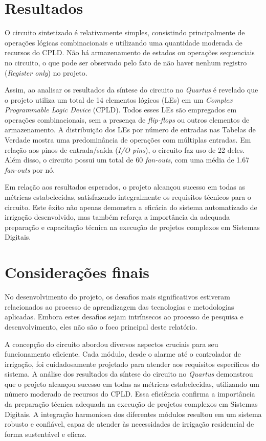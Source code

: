 \documentclass[
	article,			%
	11pt,				%
	oneside,			%
	a4paper,			%
	english,			%
	brazil,				%
	sumario=tradicional
	]{abntex2}
\begin{document}
\section{Resultados}

O circuito sintetizado é relativamente simples, consistindo principalmente de operações lógicas combinacionais e utilizando uma quantidade moderada de recursos do CPLD. Não há armazenamento de estados ou operações sequenciais no circuito, o que pode ser observado pelo fato de não haver nenhum registro (\textit{Register only}) no projeto. 


Assim, ao analisar os resultados da síntese do circuito no \textit{Quartus} é revelado que o projeto utiliza um total de 14 elementos lógicos (LEs) em um \textit{Complex Programmable Logic Device} (CPLD). Todos esses LEs são empregados em operações combinacionais, sem a presença de \textit{flip-flops} ou outros elementos de armazenamento. A distribuição dos LEs por número de entradas nas Tabelas de Verdade mostra uma predominância de operações com múltiplas entradas. Em relação aos pinos de entrada/saída (\textit{I/O pins}), o circuito faz uso de 22 deles. Além disso, o circuito possui um total de 60 \textit{fan-outs}, com uma média de 1.67 \textit{fan-outs} por nó. 

Em relação aos resultados esperados, o projeto alcançou sucesso em todas as métricas estabelecidas, satisfazendo integralmente os requisitos técnicos para o circuito. Este êxito não apenas demonstra a eficácia do sistema automatizado de irrigação desenvolvido, mas também reforça a importância da adequada preparação e capacitação técnica na execução de projetos complexos em Sistemas Digitais.
% 

\section*{Considerações finais}

No desenvolvimento do projeto, os desafios mais significativos estiveram relacionados ao processo de aprendizagem das tecnologias e metodologias aplicadas. Embora estes desafios sejam intrínsecos ao processo de pesquisa e desenvolvimento, eles não são o foco principal deste relatório. 

A concepção do circuito abordou diversos aspectos cruciais para seu funcionamento eficiente. Cada módulo, desde o alarme até o controlador de irrigação, foi cuidadosamente projetado para atender aos requisitos específicos do sistema. A análise dos resultados da síntese do circuito no \textit{Quartus} demonstrou que o projeto alcançou sucesso em todas as métricas estabelecidas, utilizando um número moderado de recursos do CPLD. Essa eficiência confirma a importância da preparação técnica adequada na execução de projetos complexos em Sistemas Digitais. A integração harmoniosa dos diferentes módulos resultou em um sistema robusto e confiável, capaz de atender às necessidades de irrigação residencial de forma sustentável e eficaz.
\end{document}
